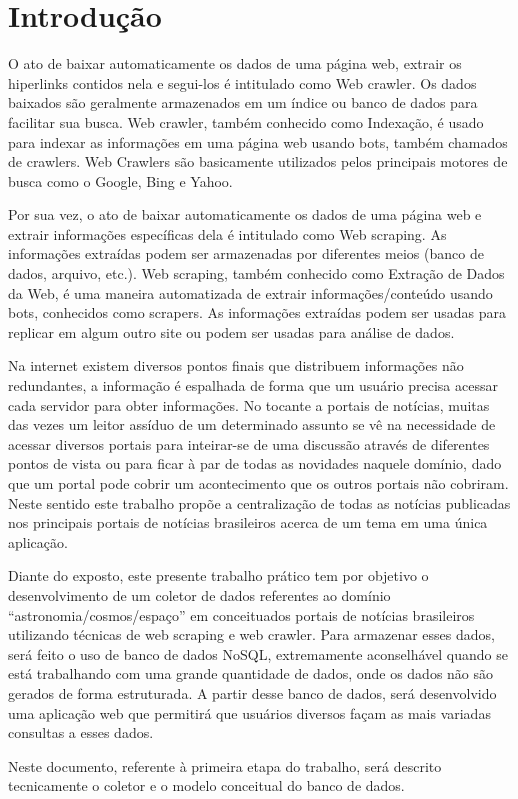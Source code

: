 \section{Introdução}
O ato de baixar automaticamente os dados de uma página web, extrair os hiperlinks contidos nela e segui-los é intitulado como Web crawler. Os dados baixados são geralmente armazenados em um índice ou banco de dados para facilitar sua busca. Web crawler, também conhecido como Indexação, é usado para indexar as informações em uma página web usando bots, também chamados de crawlers. Web Crawlers são basicamente utilizados pelos principais motores de busca como o Google, Bing e Yahoo.

Por sua vez, o ato de baixar automaticamente os dados de uma página web e extrair informações específicas dela é intitulado como Web scraping. As informações extraídas podem ser armazenadas por diferentes meios (banco de dados, arquivo, etc.). Web scraping, também conhecido como Extração de Dados da Web, é uma maneira automatizada de extrair informações/conteúdo usando bots, conhecidos como scrapers. As informações extraídas podem ser usadas para replicar em algum outro site ou podem ser usadas para análise de dados.

Na internet existem diversos pontos finais que distribuem informações não redundantes, a informação é espalhada de forma que um usuário precisa acessar cada servidor para obter informações. No tocante a portais de notícias, muitas das vezes um leitor assíduo de um determinado assunto se vê na necessidade de acessar diversos portais para inteirar-se de uma discussão através de diferentes pontos de vista ou para ficar à par de todas as novidades naquele domínio, dado que um portal pode cobrir um acontecimento que os outros portais não cobriram. Neste sentido este trabalho propõe a centralização de todas as notícias publicadas nos principais portais de notícias brasileiros acerca de um tema em uma única aplicação.

Diante do exposto, este presente trabalho prático tem por objetivo o desenvolvimento de um coletor de dados referentes ao domínio “astronomia/cosmos/espaço” em conceituados portais de notícias brasileiros utilizando técnicas de web scraping e web crawler. Para armazenar esses dados, será feito o uso de banco de dados NoSQL, extremamente aconselhável quando se está trabalhando com uma grande quantidade de dados, onde os dados não são gerados de forma estruturada. A partir desse banco de dados, será desenvolvido uma aplicação web que permitirá que usuários diversos façam as mais variadas consultas a esses dados.

Neste documento, referente à primeira etapa do trabalho, será descrito tecnicamente o coletor e o modelo conceitual do banco de dados.

